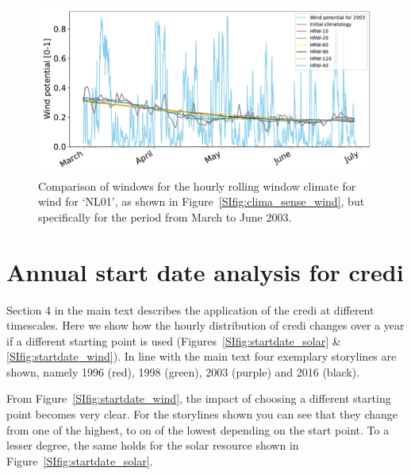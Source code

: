 \documentclass[12pt]{iopart}
\newcommand{\credi}[0]{{\sc credi}}
\begin{document}
\begin{figure}[ht]
    \centering
    \includegraphics[width=\textwidth]{Figures_SI/Climatology_sensitivity_zoom_wind.pdf}
    \caption{Comparison of windows for the hourly rolling window climate for wind for `NL01', as shown in Figure~\ref{SIfig:clima_sense_wind}, but specifically for the period from March to June 2003.}
    \label{SIfig:clima_sense_zoom_wind}
\end{figure}




\section{Annual start date analysis for \credi}\label{app:startdate}
Section 4 in the main text describes the application of the \credi{} at different timescales. 
Here we show how the hourly distribution of \credi{} changes over a year if a different starting point is used (Figures~\ref{SIfig:startdate_solar} \& \ref{SIfig:startdate_wind}). 
In line with the main text four exemplary storylines are shown, namely 1996 (red), 1998 (green), 2003 (purple) and 2016 (black).

From Figure~\ref{SIfig:startdate_wind}, the impact of choosing a different starting point becomes very clear.  
For the storylines shown you can see that they change from one of the highest, to on of the lowest depending on the start point. 
To a lesser degree, the same holds for the solar resource shown in  Figure~\ref{SIfig:startdate_solar}.
\end{document}
